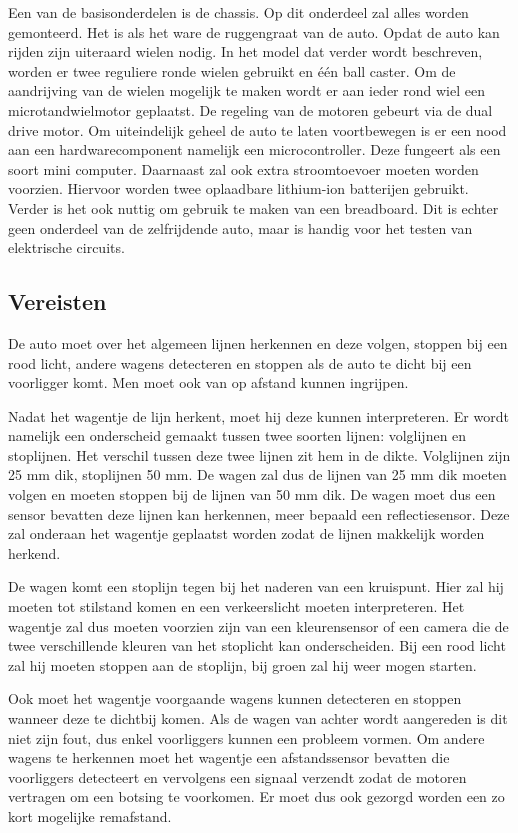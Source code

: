 \documentclass[a4paper,twoside,kulak]{kulakreport} %
\begin{document}
Een van de basisonderdelen is de chassis. Op dit onderdeel zal alles worden gemonteerd. Het is als het ware de ruggengraat van de auto.%
Opdat de auto kan rijden zijn uiteraard wielen nodig. In het model dat verder wordt beschreven, worden er twee reguliere ronde wielen gebruikt en één ball caster. Om de aandrijving van de wielen mogelijk te maken wordt er aan ieder rond wiel een microtandwielmotor geplaatst. De regeling van de motoren gebeurt via de dual drive motor. Om uiteindelijk geheel de auto te laten voortbewegen is er een nood aan een hardwarecomponent namelijk een microcontroller. Deze fungeert als een soort mini computer. Daarnaast zal ook extra stroomtoevoer moeten worden voorzien. Hiervoor worden twee oplaadbare lithium-ion batterijen gebruikt. Verder is het ook nuttig om gebruik te maken van een breadboard. Dit is echter geen onderdeel van de zelfrijdende auto, maar is handig voor het testen van elektrische circuits.

\subsection{Vereisten} \label{Vereisten}%
De auto moet over het algemeen lijnen herkennen en deze volgen, stoppen bij een rood licht, andere wagens detecteren en stoppen als de auto te dicht bij een voorligger komt. Men moet ook van op afstand kunnen ingrijpen.

Nadat het wagentje de lijn herkent, moet hij deze kunnen interpreteren. Er wordt namelijk een onderscheid gemaakt tussen twee soorten lijnen: volglijnen en stoplijnen. Het verschil tussen deze twee lijnen zit hem in de dikte. Volglijnen zijn 25 mm dik, stoplijnen 50 mm. De wagen zal dus de lijnen van 25 mm dik moeten volgen en moeten stoppen bij de lijnen van 50 mm dik. De wagen moet dus een sensor bevatten deze lijnen kan herkennen, meer bepaald een reflectiesensor. Deze zal onderaan het wagentje geplaatst worden zodat de lijnen makkelijk worden herkend.

De wagen komt een stoplijn tegen bij het naderen van een kruispunt. Hier zal hij moeten tot stilstand komen en een verkeerslicht moeten interpreteren. Het wagentje zal dus moeten voorzien zijn van een kleurensensor of een camera die de twee verschillende kleuren van het stoplicht kan onderscheiden. Bij een rood licht zal hij moeten stoppen aan de stoplijn, bij groen zal hij weer mogen starten.

Ook moet het wagentje voorgaande wagens kunnen detecteren en stoppen wanneer deze te dichtbij komen. Als de wagen van achter wordt aangereden is dit niet zijn fout, dus enkel voorliggers kunnen een probleem vormen. Om andere wagens te herkennen moet het wagentje een afstandssensor bevatten die voorliggers detecteert en vervolgens een signaal verzendt zodat de motoren vertragen om een botsing te voorkomen. Er moet dus ook gezorgd worden een zo kort mogelijke remafstand.
\end{document}
